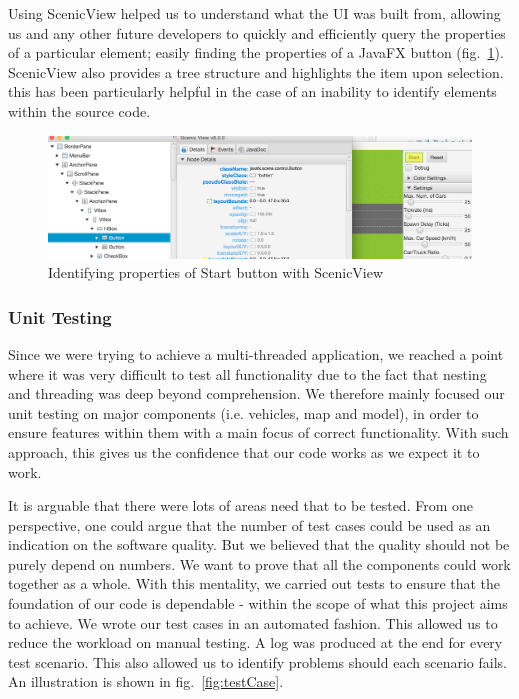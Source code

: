 Using ScenicView helped us to understand what the UI was built from, allowing us and any other future developers to quickly and efficiently query the properties of a particular element; easily finding the properties of a JavaFX button (fig.~\ref{fig:scenicview}). ScenicView also provides a tree structure and highlights the item upon selection. this has been particularly helpful in the case of an inability to identify elements within the source code.  
\begin{figure}[h]
	\begin{center}
		\includegraphics[width=\textwidth]{img/scenicView.png}
		\caption[Identifying properties of Start button with ScenicView]{Identifying properties of Start button with ScenicView}
	\label{fig:scenicview}
	\end{center}
\end{figure}

\subsubsection*{Unit Testing}
Since we were trying to achieve a multi-threaded application, we reached a point where it was very difficult to test all functionality due to the fact that nesting and threading was deep beyond comprehension. We therefore mainly focused our unit testing on major components (i.e. vehicles, map and model), in order to ensure features within them with a main focus of correct functionality. With such approach, this gives us the confidence that our code works as we expect it to work. 

It is arguable that there were lots of areas need that to be tested. From one perspective, one could argue that the number of test cases could be used as an indication on the software quality. But we believed that the quality should not be purely depend on numbers. We want to prove that all the components could work together as a whole.  With this mentality, we carried out tests to ensure that the foundation of our code is dependable - within the scope of what this project aims to achieve.  We wrote our test cases in an automated fashion. This allowed us to reduce the workload on manual testing.  A log was produced at the end for every test scenario. This also allowed us to identify problems should each scenario fails. An illustration is shown in fig.~\ref{fig:testCase}. 

